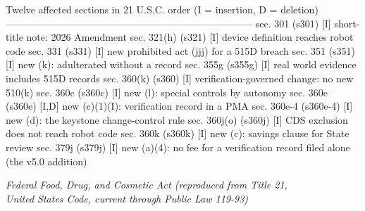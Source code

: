 \begin{asciifig}
 Twelve affected sections in 21 U.S.C. order (I = insertion, D = deletion)
---------------------------------------------------------------------------
  sec. 301     (s301)     [I]   short-title note: 2026 Amendment
  sec. 321(h)  (s321)     [I]   device definition reaches robot code
  sec. 331     (s331)     [I]   new prohibited act (jjj) for a 515D breach
  sec. 351     (s351)     [I]   new (k): adulterated without a record
  sec. 355g    (s355g)    [I]   real world evidence includes 515D records
  sec. 360(k)  (s360)     [I]   verification-governed change: no new 510(k)
  sec. 360c    (s360c)    [I]   new (l): special controls by autonomy
  sec. 360e    (s360e)    [I,D] new (c)(1)(I): verification record in a PMA
  sec. 360e-4  (s360e-4)  [I]   new (d): the keystone change-control rule
  sec. 360j(o) (s360j)    [I]   CDS exclusion does not reach robot code
  sec. 360k    (s360k)    [I]   new (c): savings clause for State review
  sec. 379j    (s379j)    [I]   new (a)(4): no fee for a verification
                                record filed alone (the v5.0 addition)
\end{asciifig}
\vspace{-0.4cm}

\clearpage

\begin{center}\small\itshape Federal Food, Drug, and Cosmetic Act (reproduced from
Title 21,\\United States Code, current through Public Law 119-93)\end{center}



\begin{center}\small *\quad *\quad *\quad *\quad *\quad *\quad *\end{center}




